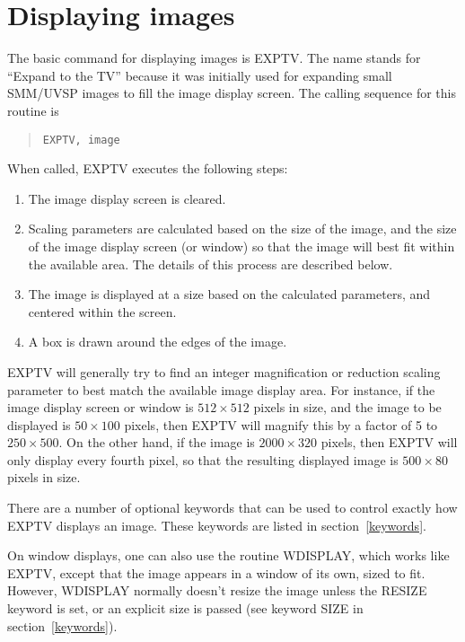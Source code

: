 \section{Displaying images}

The basic command for displaying images is EXPTV.  The name stands for ``Expand
to the TV'' because it was initially used for expanding small SMM/UVSP images
to fill the image display screen.  The calling sequence for this routine is
\begin{quote}
\begin{verbatim}
EXPTV, image
\end{verbatim}
\end{quote}
When called, EXPTV executes the following steps:
\begin{enumerate}
\item
The image display screen is cleared.
\item
Scaling parameters are calculated based on the size of the image, and the size
of the image display screen (or window) so that the image will best fit within
the available area.  The details of this process are described below.
\item
The image is displayed at a size based on the calculated parameters, and
centered within the screen.
\item
A box is drawn around the edges of the image.
\end{enumerate}

EXPTV will generally try to find an integer magnification or reduction scaling
parameter to best match the available image display area.  For instance, if the
image display screen or window is \mbox{$512 \times 512$} pixels in size, and
the image to be displayed is \mbox{$50 \times 100$} pixels, then EXPTV will
magnify this by a factor of 5 to \mbox{$250 \times 500$}.  On the other hand,
if the image is \mbox{$2000 \times 320$} pixels, then EXPTV will only display
every fourth pixel, so that the resulting displayed image is \mbox{$500 \times
80$} pixels in size.

There are a number of optional keywords that can be used to control exactly how
EXPTV displays an image.  These keywords are listed in section~\ref{keywords}.

On window displays, one can also use the routine WDISPLAY, which works like
EXPTV, except that the image appears in a window of its own, sized to fit.
However, WDISPLAY normally doesn't resize the image unless the RESIZE keyword
is set, or an explicit size is passed (see keyword SIZE in
section~\ref{keywords}).

